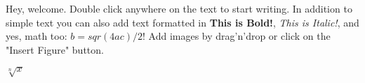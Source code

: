 Hey, welcome. Double click anywhere on the text to start writing. In addition to simple text you can also add text formatted in \textbf{This is Bold!}, \textit{This is Italic!}, and yes, math too: $b = sqr(4ac)/2$! Add images by drag'n'drop or click on the "Insert Figure" button.

$\sqrt[n]{x}$